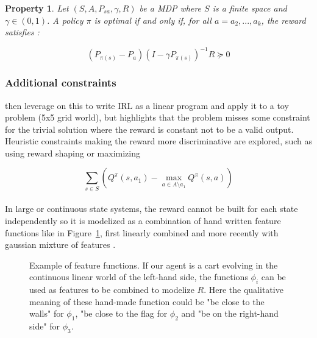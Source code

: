 \documentclass{article}
\newtheorem{property}{Property}
\begin{document}
\begin{property}
\label{prop:irl}
Let  $(S,A,P_{sa},\gamma,R)$ be a MDP where $S$ is a finite space and $\gamma \in (0,1)$. A policy $\pi$ is optimal if and only if, for all $a=a_{2},...,a_{k}$, the reward satisfies :

\[
(P_{\pi(s)} - P_a)(I - \gamma P_{\pi(s)})^{-1} R \succeq 0
\]
\end{property}

\subsubsection{Additional constraints}

\cite{Ng00} then leverage on this to write IRL as a linear program and apply it to a toy problem (5x5 grid world), but highlights that the problem misses some constraint for the trivial solution where the reward is constant not to be a valid output. Heuristic constraints making the reward more discriminative are explored, such as using reward shaping \cite{Ng99} or maximizing

\[
\sum _{s \in S}\left(Q^\pi(s, a_1) - \max_{a \in A \setminus a_1} Q^\pi(s,a)\right)
\]

\paragraph{}
In large or continuous state systems, the reward cannot be built for each state independently so it is modelized as a combination of hand written feature functions like in Figure~\ref{fig:features}, first linearly combined \cite{Abbeel04} and more recently with gaussian mixture of features \cite{Levine11}.

\begin{figure}
\begin{center}
\end{center}
\caption{Example of feature functions. If our agent is a cart evolving in the continuous linear world of the left-hand side, the functions $\phi_i$ can be used as features to be combined to modelize $R$. Here the qualitative meaning of these hand-made function could be "be close to the walls" for $\phi_1$, "be close to the flag for $\phi_2$ and "be on the right-hand side" for $\phi_3$. \label{fig:features}}
\end{figure}
\end{document}
